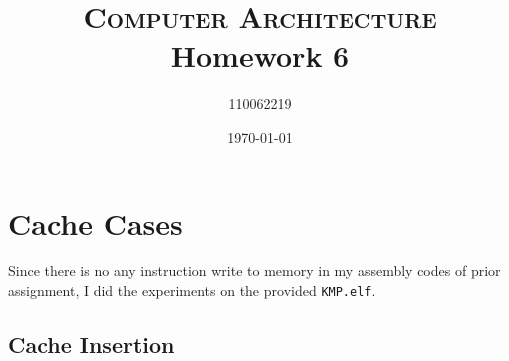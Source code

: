 \documentclass[12pt, a4paper]{article}
\title{\textsc{Computer Architecture} Homework 6}
\author{110062219}
\date{\today}
\begin{document}
\maketitle
\tableofcontents

\section{Cache Cases}

Since there is no any instruction write to memory in my assembly codes of prior assignment, I did the experiments on the provided \texttt{KMP.elf}.

\subsection{Cache Insertion}
\end{document}
